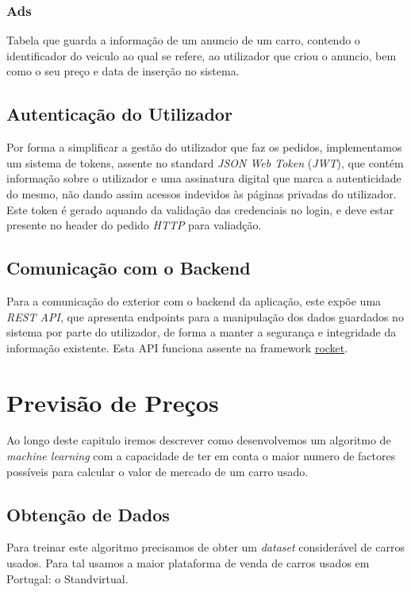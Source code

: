 \documentclass[a4paper]{report}
\begin{document}
\subsection{Ads}

Tabela que guarda a informação de um anuncio de um carro, contendo o identificador
do veiculo ao qual se refere, ao utilizador que criou o anuncio, bem como o seu preço
e data de inserção no sistema.

\section{Autenticação do Utilizador}

Por forma a simplificar a gestão do utilizador que faz os pedidos,
implementamos um sistema de tokens, assente no standard \textit{JSON Web
Token} (\textit{JWT}), que contém informação sobre o utilizador e uma assinatura 
digital que marca a autenticidade do mesmo, não dando assim acessos indevidos às 
páginas privadas do utilizador. Este token é gerado aquando da validação das credenciais
no login, e deve estar presente no header do pedido \textit{HTTP} para valiadção.

\section{Comunicação com o Backend}

Para a comunicação do exterior com o backend da aplicação, este expõe uma \textit{REST API},
que apresenta endpoints para a manipulação dos dados guardados no sistema por parte do utilizador,
de forma a manter a segurança e integridade da informação existente. Esta API funciona assente na
framework \href{http://rocket.rs}{rocket}.

\chapter{Previsão de Preços}

Ao longo deste capitulo iremos descrever como desenvolvemos um algoritmo de
\textit{machine learning} com a capacidade de ter em conta o maior numero de factores
possíveis para calcular o valor de mercado de um carro usado.

\section {Obtenção de Dados}

Para treinar este algoritmo precisamos de obter um \textit{dataset} considerável de
carros usados. Para tal usamos a maior plataforma de venda de carros usados em Portugal:
o Standvirtual.
\end{document}
